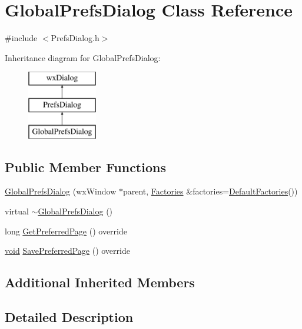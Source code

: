 \hypertarget{class_global_prefs_dialog}{}\section{Global\+Prefs\+Dialog Class Reference}
\label{class_global_prefs_dialog}


{\ttfamily \#include $<$Prefs\+Dialog.\+h$>$}

Inheritance diagram for Global\+Prefs\+Dialog\+:\begin{figure}[H]
\begin{center}
\leavevmode
\includegraphics[height=3.000000cm]{class_global_prefs_dialog}
\end{center}
\end{figure}
\subsection*{Public Member Functions}
\begin{DoxyCompactItemize}
\item 
\hyperlink{class_global_prefs_dialog_a7938c626cb9a221843a69d7a371d78ce}{Global\+Prefs\+Dialog} (wx\+Window $\ast$parent, \hyperlink{class_prefs_dialog_abce19159c638bc50c25147e479275388}{Factories} \&factories=\hyperlink{class_prefs_dialog_ac42cda72337d03c90b4cd7951b8e0dcd}{Default\+Factories}())
\item 
virtual \hyperlink{class_global_prefs_dialog_aaaf5c913d546d0968ae44d9f2668d852}{$\sim$\+Global\+Prefs\+Dialog} ()
\item 
long \hyperlink{class_global_prefs_dialog_afae2463bec1cbdf71fd8ec6b154ead26}{Get\+Preferred\+Page} () override
\item 
\hyperlink{sound_8c_ae35f5844602719cf66324f4de2a658b3}{void} \hyperlink{class_global_prefs_dialog_abf2e6db4ccb3a52957615b57b4bc5b3f}{Save\+Preferred\+Page} () override
\end{DoxyCompactItemize}
\subsection*{Additional Inherited Members}


\subsection{Detailed Description}


